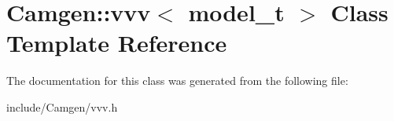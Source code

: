 \hypertarget{a00594}{}\section{Camgen\+:\+:vvv$<$ model\+\_\+t $>$ Class Template Reference}
\label{a00594}


The documentation for this class was generated from the following file\+:\begin{DoxyCompactItemize}
\item 
include/\+Camgen/vvv.\+h\end{DoxyCompactItemize}
